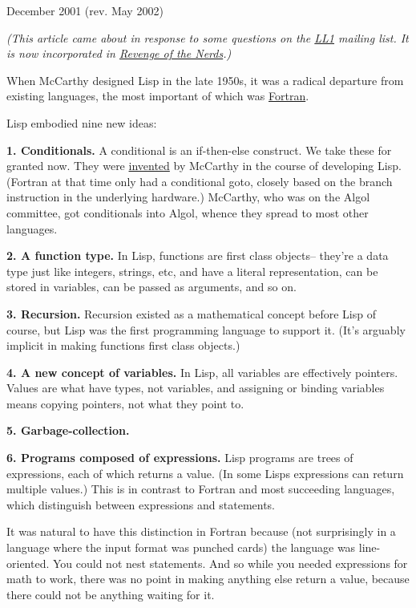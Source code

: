 December 2001 (rev. May 2002)

\emph{(This article came about in response to some questions on the
\href{http://ll1.mit.edu}{LL1} mailing list. It is now incorporated in
\href{icad.html}{Revenge of the Nerds}.)}

When McCarthy designed Lisp in the late 1950s, it was a radical
departure from existing languages, the most important of which was
\href{history.html}{Fortran}.

Lisp embodied nine new ideas:

\textbf{1. Conditionals.} A conditional is an if-then-else construct. We
take these for granted now. They were
\href{http://www-formal.stanford.edu/jmc/history/lisp/node2.html}{invented}
by McCarthy in the course of developing Lisp. (Fortran at that time only
had a conditional goto, closely based on the branch instruction in the
underlying hardware.) McCarthy, who was on the Algol committee, got
conditionals into Algol, whence they spread to most other languages.

\textbf{2. A function type.} In Lisp, functions are first class
objects-- they're a data type just like integers, strings, etc, and have
a literal representation, can be stored in variables, can be passed as
arguments, and so on.

\textbf{3. Recursion.} Recursion existed as a mathematical concept
before Lisp of course, but Lisp was the first programming language to
support it. (It's arguably implicit in making functions first class
objects.)

\textbf{4. A new concept of variables.} In Lisp, all variables are
effectively pointers. Values are what have types, not variables, and
assigning or binding variables means copying pointers, not what they
point to.

\textbf{5. Garbage-collection.}

\textbf{6. Programs composed of expressions.} Lisp programs are trees of
expressions, each of which returns a value. (In some Lisps expressions
can return multiple values.) This is in contrast to Fortran and most
succeeding languages, which distinguish between expressions and
statements.

It was natural to have this distinction in Fortran because (not
surprisingly in a language where the input format was punched cards) the
language was line-oriented. You could not nest statements. And so while
you needed expressions for math to work, there was no point in making
anything else return a value, because there could not be anything
waiting for it.

